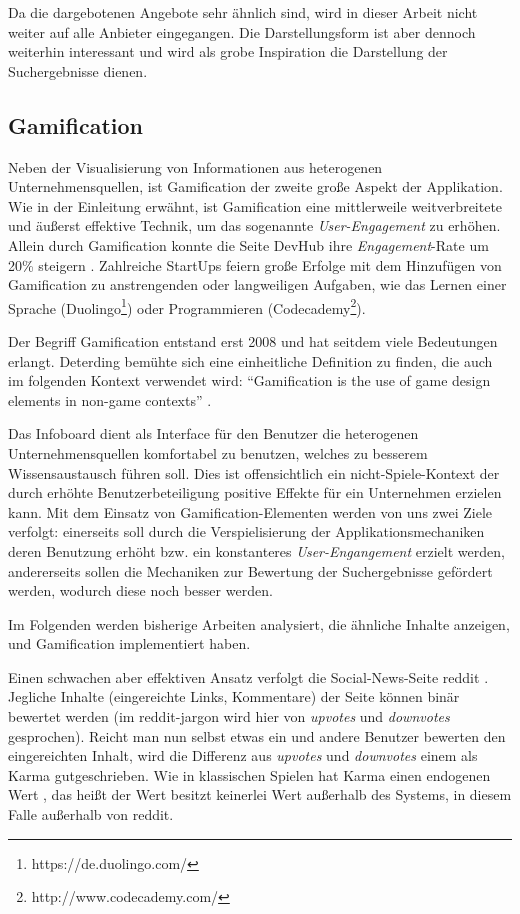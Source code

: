 \documentclass[12pt,twoside]{book}
\begin{document}
Da die dargebotenen Angebote sehr ähnlich sind, wird in dieser Arbeit nicht weiter auf alle Anbieter eingegangen. Die Darstellungsform ist aber dennoch weiterhin interessant und wird als grobe Inspiration die Darstellung der Suchergebnisse dienen.


\subsection {Gamification}\label{sec:intro_game}

Neben der Visualisierung  von Informationen aus heterogenen Unternehmensquellen, ist Gamification der zweite große Aspekt der Applikation. Wie in der Einleitung erwähnt, ist Gamification eine mittlerweile weitverbreitete und äußerst effektive Technik, um das sogenannte \textit{User-Engagement} zu erhöhen. Allein durch Gamification konnte die Seite DevHub ihre \textit{Engagement}-Rate um 20\% steigern \citep[pp. 17]{zichermann2011gamification}. Zahlreiche StartUps feiern große Erfolge mit dem Hinzufügen von Gamification zu anstrengenden oder langweiligen Aufgaben, wie das Lernen einer Sprache (Duolingo\footnote{https://de.duolingo.com/}) oder Programmieren (Codecademy\footnote{http://www.codecademy.com/}).

Der Begriff Gamification entstand erst 2008 und hat seitdem viele Bedeutungen erlangt. Deterding \cite{deterding2011game} bemühte sich eine einheitliche Definition zu finden, die auch im folgenden Kontext verwendet wird: ``Gamification is the use of game design elements in non-game contexts'' \citep{deterding2011game}.

Das Infoboard dient als Interface für den Benutzer die heterogenen Unternehmensquellen komfortabel zu benutzen, welches zu besserem Wissensaustausch führen soll. Dies ist offensichtlich ein nicht-Spiele-Kontext der durch erhöhte Benutzerbeteiligung positive Effekte für ein Unternehmen erzielen kann.
Mit dem Einsatz von Gamification-Elementen werden von uns zwei Ziele verfolgt: einerseits soll durch die Verspielisierung der Applikationsmechaniken deren Benutzung erhöht bzw. ein konstanteres \textit{User-Engangement} erzielt werden, andererseits sollen die Mechaniken zur Bewertung der Suchergebnisse gefördert werden, wodurch diese noch besser werden.

Im Folgenden werden bisherige Arbeiten analysiert, die ähnliche Inhalte anzeigen, und Gamification implementiert haben.

Einen schwachen aber effektiven Ansatz verfolgt die Social-News-Seite reddit \cite{reddit}. Jegliche Inhalte (eingereichte Links, Kommentare) der Seite können binär bewertet werden (im reddit-jargon wird hier von \textit{upvotes} und \textit{downvotes} gesprochen). Reicht man nun selbst etwas ein und andere Benutzer bewerten den eingereichten Inhalt, wird die Differenz aus \textit{upvotes} und \textit{downvotes} einem als Karma gutgeschrieben. Wie in klassischen Spielen hat Karma einen endogenen Wert \citep[pp. 21 - 22]{costikyan2005have}, das heißt der Wert besitzt keinerlei Wert außerhalb des Systems, in diesem Falle außerhalb von reddit.
\end{document}
